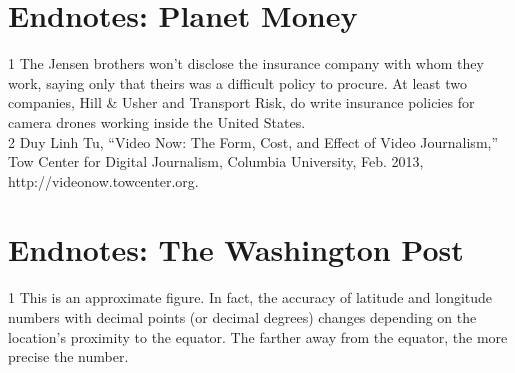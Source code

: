 \section{Endnotes: Planet Money}
1 The Jensen brothers won't disclose the insurance company with whom they work, saying only that
theirs was a difficult policy to procure. At least two companies, Hill & Usher and Transport Risk,
do write insurance policies for camera drones working inside the United States.\\
2 Duy Linh Tu, ``Video Now: The Form, Cost, and Effect of Video Journalism,'' Tow Center for
Digital Journalism, Columbia University, Feb. 2013, http://videonow.towcenter.org.\\

\section{Endnotes: The Washington Post}
1 This is an approximate figure. In fact, the accuracy of latitude and longitude numbers with
decimal points (or decimal degrees) changes depending on the location's proximity to the equator.
The farther away from the equator, the more precise the number.\\

